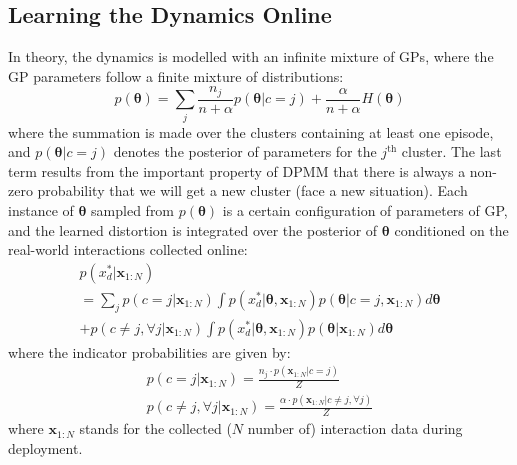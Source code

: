 \subsection{Learning the Dynamics Online}
In theory, the dynamics is modelled with an infinite mixture of GPs, where the GP parameters follow a finite mixture of distributions:
\begin{equation}
p(\bm{\theta}) = \sum_j \frac{n_j}{n + \alpha} p(\bm{\theta}|c=j) 
+ \frac{\alpha}{n + \alpha} H(\bm{\theta})
\label{trained_mixture_model}
\end{equation}
where the summation is made over the clusters containing at least one episode, and $p(\bm{\theta}|c=j)$ denotes the posterior of parameters for the $j^{\text{th}}$ cluster.
The last term results from the important property of DPMM that there is always a non-zero probability that we will get a new cluster (face a new situation).
Each instance of $\bm{\theta}$ sampled from $p(\bm{\theta})$ is a certain configuration of parameters of GP, and the learned distortion is integrated over the posterior of $\bm{\theta}$ conditioned on the real-world interactions collected online:
\begin{equation}
\begin{gathered}
p(x^*_d|\bm{x}_{1:N}) 
\\
= \sum_j p(c=j| \bm{x}_{1:N}) \int p(x^*_d|\bm{\theta}, \bm{x}_{1:N})p(\bm{\theta}|c=j, \bm{x}_{1:N}) d\bm{\theta} 
\\
+ p(c \neq j, \forall j|\bm{x}_{1:N}) \int p(x^*_d|\bm{\theta}, \bm{x}_{1:N}) p(\bm{\theta} | \bm{x}_{1:N}) d\bm{\theta}
\end{gathered}
\label{MGP_posterior}
\end{equation}
where the indicator probabilities are given by:
\begin{equation}
\begin{gathered}
p(c=j| \bm{x}_{1:N}) 
= \frac{n_j \cdot p(\bm{x}_{1:N}|c=j)
}{Z}
\\ 
p(c \neq j, \forall j| \bm{x}_{1:N})
= \frac{\alpha \cdot p(\bm{x}_{1:N}|c \neq j, \forall j)
}{Z}
\end{gathered}
\label{MGP_indicator}
\end{equation}
where $\bm{x}_{1:N}$ stands for the collected ($N$ number of) interaction data during deployment.


